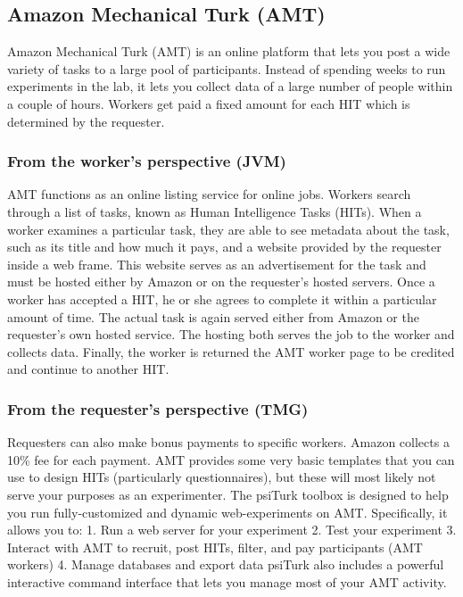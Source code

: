 \documentclass[jou,apacite]{apa6}
\begin{document}
\subsection{Amazon Mechanical Turk (AMT)} 

Amazon Mechanical Turk (AMT) is an online platform that lets you post a wide variety of tasks to a large pool of participants.
Instead of spending weeks to run experiments in the lab, it lets you collect data of a large number of people within a couple of hours.
Workers get paid a fixed amount for each HIT which is determined by the requester.

\subsubsection{From the worker's perspective (JVM)}
AMT functions as an online listing service for online jobs.
Workers search through a list of tasks, known as Human Intelligence Tasks (HITs). 
When a worker examines a particular task, they are able to see metadata about the task, such as its title and how much it pays, and a website provided by the requester inside a web frame.
This website serves as an advertisement for the task and must be hosted either by Amazon or on the requester's hosted servers.
Once a worker has accepted a HIT, he or she agrees to complete it within a particular amount of time.
The actual task is again served either from Amazon or the requester's own hosted service.
The hosting both serves the job to the worker and collects data.
Finally, the worker is returned the AMT worker page to be credited and continue to another HIT.

\subsubsection{From the requester's perspective (TMG)}
Requesters can also make bonus payments to specific workers. Amazon collects a 10\% fee for each payment.
AMT provides some very basic templates that you can use to design HITs (particularly questionnaires), but these will most likely not serve your purposes as an experimenter.
The psiTurk toolbox is designed to help you run fully-customized and dynamic web-experiments on AMT.
Specifically, it allows you to:
1. Run a web server for your experiment
2. Test your experiment
3. Interact with AMT to recruit, post HITs, filter, and pay participants (AMT workers)
4. Manage databases and export data
psiTurk also includes a powerful interactive command interface that lets you manage most of your AMT activity.
\end{document}
